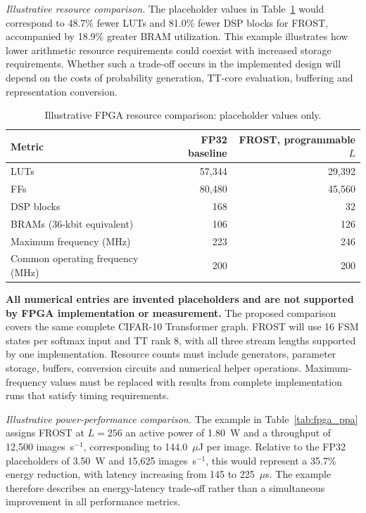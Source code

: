 \documentclass[pdflatex,sn-mathphys-num]{sn-jnl}
\theoremstyle{thmstyleone}
\theoremstyle{thmstyletwo}
\theoremstyle{thmstylethree}
\begin{document}
\textit{Illustrative resource comparison.}
The placeholder values in Table~\ref{tab:fpga_resources_draft} would
correspond to 48.7\% fewer LUTs and 81.0\% fewer DSP blocks for FROST, accompanied by 18.9\% greater BRAM utilization. This example illustrates how lower arithmetic resource requirements could coexist with increased storage requirements. Whether such a trade-off occurs in the implemented
design will depend on the costs of probability generation, TT-core evaluation, buffering and representation conversion.

\begin{table}[!htbp]
\caption{Illustrative FPGA resource comparison: placeholder values only.}
\label{tab:fpga_resources_draft}
\centering
\small
\setlength{\tabcolsep}{5pt}
\renewcommand{\arraystretch}{1.08}
\begin{tabular*}{\linewidth}{@{\extracolsep{\fill}}lrr@{}}
\toprule
Metric & FP32 baseline & FROST, programmable $L$ \\
\midrule
LUTs & 57,344 & 29,392 \\
FFs & 80,480 & 45,560 \\
DSP blocks & 168 & 32 \\
BRAMs (36-kbit equivalent) & 106 & 126 \\
Maximum frequency (MHz) & 223 & 246 \\
Common operating frequency (MHz) & 200 & 200 \\
\bottomrule
\end{tabular*}
\par\vspace{3pt}
\begin{minipage}{\linewidth}
\fontsize{8}{9.5}\selectfont
\textbf{All numerical entries are invented placeholders and are not
supported by FPGA implementation or measurement.}
The proposed comparison covers the same complete CIFAR-10 Transformer graph. FROST will use 16 FSM states per softmax input and TT rank 8, with all three stream lengths supported by one implementation. Resource counts must include generators, parameter storage, buffers, conversion circuits and numerical helper operations.
Maximum-frequency values must be replaced with results from complete implementation runs that satisfy timing requirements.
\end{minipage}
\end{table}

\textit{Illustrative power-performance comparison.}
The example in Table~\ref{tab:fpga_ppa} assigns FROST at $L=256$ an active power of 1.80~W and a throughput of 12,500 images~s$^{-1}$, corresponding to 144.0~$\mu$J per image. Relative to the FP32 placeholders of 3.50~W and 15,625 images~s$^{-1}$, this would represent a 35.7\% energy reduction, with latency increasing from 145 to 225~$\mu$s. The example therefore describes an energy-latency trade-off rather than a simultaneous improvement in all performance metrics.
\end{document}
